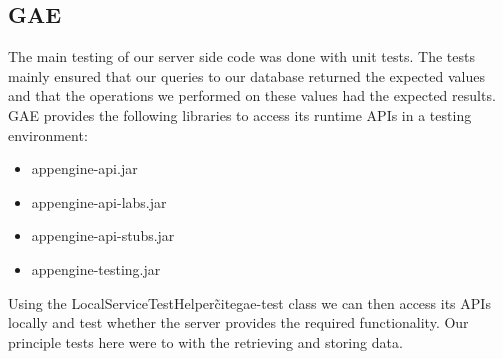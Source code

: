 \subsection{GAE}
The main testing of our server side code was done with unit tests. The tests
mainly ensured that our queries to our database returned the expected values and
that the operations we performed on these values had the expected results. GAE
provides the following libraries to access its runtime APIs in a testing
environment:
\begin{itemize}
  \item appengine-api.jar
  \item appengine-api-labs.jar
  \item appengine-api-stubs.jar
  \item appengine-testing.jar
\end{itemize}
Using the LocalServiceTestHelper\~cite{gae-test} class we can then access its
APIs locally and test whether the server provides the required functionality.
Our principle tests here were to with the retrieving and storing data.
